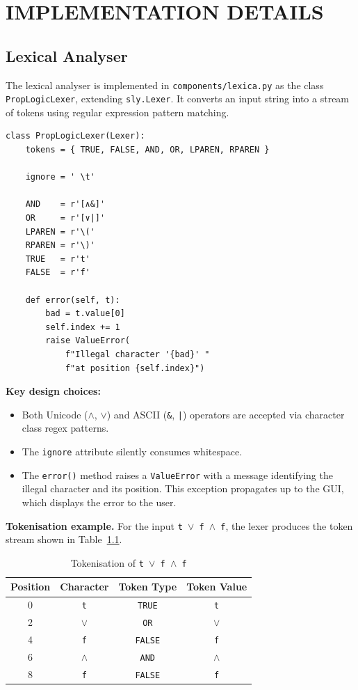 \chapter{IMPLEMENTATION DETAILS}

\section{Lexical Analyser}

The lexical analyser is implemented in \texttt{components/lexica.py} as the class \texttt{PropLogicLexer}, extending \texttt{sly.Lexer}. It converts an input string into a stream of tokens using regular expression pattern matching.

\begin{lstlisting}[caption={Token definitions in \texttt{PropLogicLexer}}, label={lst:lexer}]
class PropLogicLexer(Lexer):
    tokens = { TRUE, FALSE, AND, OR, LPAREN, RPAREN }

    ignore = ' \t'

    AND    = r'[∧&]'
    OR     = r'[∨|]'
    LPAREN = r'\('
    RPAREN = r'\)'
    TRUE   = r't'
    FALSE  = r'f'

    def error(self, t):
        bad = t.value[0]
        self.index += 1
        raise ValueError(
            f"Illegal character '{bad}' "
            f"at position {self.index}")
\end{lstlisting}

\textbf{Key design choices:}
\begin{itemize}
    \item Both Unicode ($\wedge$, $\vee$) and ASCII (\texttt{\&}, \texttt{|}) operators are accepted via character class regex patterns.
    \item The \texttt{ignore} attribute silently consumes whitespace.
    \item The \texttt{error()} method raises a \texttt{ValueError} with a message identifying the illegal character and its position.  This exception propagates up to the GUI, which displays the error to the user.
\end{itemize}

\textbf{Tokenisation example.} For the input \texttt{t $\vee$ f $\wedge$ f}, the lexer produces the token stream shown in Table~\ref{table:tokenisation}.

\begin{table}[H]
\centering
\caption{Tokenisation of \texttt{t $\vee$ f $\wedge$ f}}
\label{table:tokenisation}
\begin{tabular}{@{}cccc@{}}
\toprule
Position & Character & Token Type & Token Value \\
\midrule
0 & \texttt{t}       & \texttt{TRUE}  & \texttt{t} \\
2 & $\vee$           & \texttt{OR}    & $\vee$ \\
4 & \texttt{f}       & \texttt{FALSE} & \texttt{f} \\
6 & $\wedge$         & \texttt{AND}   & $\wedge$ \\
8 & \texttt{f}       & \texttt{FALSE} & \texttt{f} \\
\bottomrule
\end{tabular}
\end{table}

